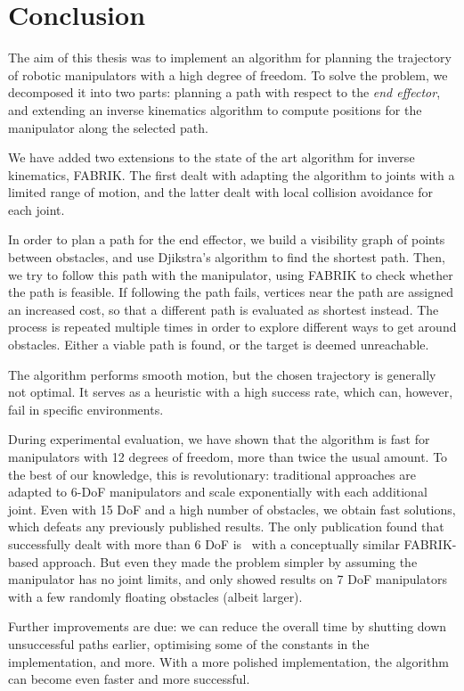 \chapter{Conclusion}

The aim of this thesis was to implement an algorithm for planning the trajectory of robotic manipulators with a high degree of freedom. To solve the problem, we decomposed it into two parts: planning a path with respect to the \textit{end effector}, and extending an inverse kinematics algorithm to compute positions for the manipulator along the selected path.

We have added two extensions to the state of the art algorithm for inverse kinematics, FABRIK. The first dealt with adapting the algorithm to joints with a limited range of motion, and the latter dealt with local collision avoidance for each joint.

In order to plan a path for the end effector, we build a visibility graph of points between obstacles, and use Djikstra's algorithm to find the shortest path. Then, we try to follow this path with the manipulator, using FABRIK to check whether the path is feasible. If following the path fails, vertices near the path are assigned an increased cost, so that a different path is evaluated as shortest instead. The process is repeated multiple times in order to explore different ways to get around obstacles. Either a viable path is found, or the target is deemed unreachable.

The algorithm performs smooth motion, but the chosen trajectory is generally not optimal. It serves as a heuristic with a high success rate, which can, however, fail in specific environments.

During experimental evaluation, we have shown that the algorithm is fast for manipulators with 12 degrees of freedom, more than twice the usual amount. To the best of our knowledge, this is revolutionary: traditional approaches are adapted to 6-DoF manipulators and scale exponentially with each additional joint. Even with 15 DoF and a high number of obstacles, we obtain fast solutions, which defeats any previously published results. The only publication found that successfully dealt with more than 6 DoF is~\cite{rrt_fabrik} with a conceptually similar FABRIK-based approach. But even they made the problem simpler by assuming the manipulator has no joint limits, and only showed results on 7 DoF manipulators with a few randomly floating obstacles (albeit larger).

Further improvements are due: we can reduce the overall time by shutting down unsuccessful paths earlier, optimising some of the constants in the implementation, and more. With a more polished implementation, the algorithm can become even faster and more successful.

